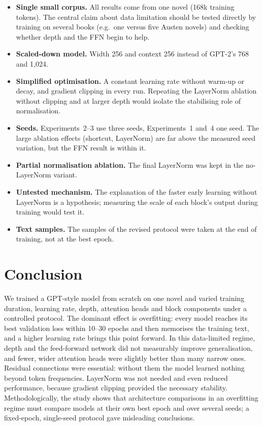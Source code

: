 \documentclass[11pt,a4paper]{article}
\begin{document}
\begin{itemize}[leftmargin=*]
  \item \textbf{Single small corpus.} All results come from one novel (168k training tokens). The central claim about data limitation should be tested directly by training on several books (e.g.\ one versus five Austen novels) and checking whether depth and the FFN begin to help.
  \item \textbf{Scaled-down model.} Width 256 and context 256 instead of GPT-2's 768 and 1,024.
  \item \textbf{Simplified optimisation.} A constant learning rate without warm-up or decay, and gradient clipping in every run. Repeating the LayerNorm ablation without clipping and at larger depth would isolate the stabilising role of normalisation.
  \item \textbf{Seeds.} Experiments~2--3 use three seeds, Experiments~1 and~4 one seed. The large ablation effects (shortcut, LayerNorm) are far above the measured seed variation, but the FFN result is within it.
  \item \textbf{Partial normalisation ablation.} The final LayerNorm was kept in the no-LayerNorm variant.
  \item \textbf{Untested mechanism.} The explanation of the faster early learning without LayerNorm is a hypothesis; measuring the scale of each block's output during training would test it.
  \item \textbf{Text samples.} The samples of the revised protocol were taken at the end of training, not at the best epoch.
\end{itemize}

\section{Conclusion}\label{sec:conclusion}

We trained a GPT-style model from scratch on one novel and varied training duration, learning rate, depth, attention heads and block components under a controlled protocol. The dominant effect is overfitting: every model reaches its best validation loss within 10--30 epochs and then memorises the training text, and a higher learning rate brings this point forward. In this data-limited regime, depth and the feed-forward network did not measurably improve generalisation, and fewer, wider attention heads were slightly better than many narrow ones. Residual connections were essential: without them the model learned nothing beyond token frequencies. LayerNorm was not needed and even reduced performance, because gradient clipping provided the necessary stability. Methodologically, the study shows that architecture comparisons in an overfitting regime must compare models at their own best epoch and over several seeds; a fixed-epoch, single-seed protocol gave misleading conclusions.
\end{document}
